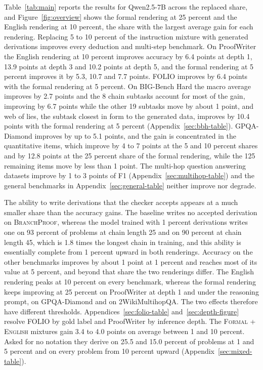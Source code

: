 \documentclass{article}
\newcommand{\formal}{\textsc{Formal}}
\newcommand{\nat}{\textsc{English}}
\newcommand{\branchproof}{\textsc{BranchProof}}
\begin{document}
Table~\ref{tab:main} reports the results for Qwen2.5-7B across the replaced
share, and Figure~\ref{fig:overview} shows the formal rendering at 25
percent and the English rendering at 10 percent, the share with the largest
average gain for each rendering. Replacing 5 to 10 percent
of the instruction mixture with generated derivations improves every
deduction and multi-step benchmark. On
ProofWriter the English rendering at 10 percent improves accuracy by 6.4
points at depth 1, 13.9 points at depth 3 and 10.2 points at depth 5, and
the formal rendering at 5 percent improves it by 5.3, 10.7 and 7.7 points.
FOLIO improves by 6.4 points with the formal rendering at 5 percent. On BIG-Bench Hard the macro average improves by 2.7 points and the 8 chain
subtasks account for most of the gain, improving by 6.7 points while the
other 19 subtasks move by about 1 point, and web of lies, the subtask
closest in form to the generated data, improves by 10.4 points with the
formal rendering at 5 percent (Appendix~\ref{sec:bbh-table}). GPQA-Diamond
improves by up to 5.1 points, and the gain is concentrated in the
quantitative items, which improve by 4 to 7 points at the 5 and 10 percent
shares and by 12.8 points at the 25 percent share of the formal rendering,
while the 125 remaining items move by less than 1 point. The multi-hop
question answering datasets improve by 1 to 3 points of F1
(Appendix~\ref{sec:multihop-table}) and the general benchmarks in
Appendix~\ref{sec:general-table} neither improve nor degrade.



The ability to write derivations that the checker accepts appears at a much
smaller share than the accuracy gains. The baseline writes no accepted
derivation on \branchproof{}, whereas the model trained with 1 percent
derivations writes one on 93 percent of problems at chain length 25 and on
90 percent at chain length 45, which is 1.8 times the longest chain in
training, and this ability is essentially complete from 1 percent upward in
both renderings. Accuracy on the other benchmarks improves by about 1 point
at 1 percent and reaches most of its value at 5 percent, and beyond that
share the two renderings differ. The English rendering peaks at 10 percent on every
benchmark, whereas the formal rendering keeps improving at 25 percent on
ProofWriter at depth 1 and under the reasoning prompt, on GPQA-Diamond and
on 2WikiMultihopQA. The two effects therefore have different thresholds.
Appendices~\ref{sec:folio-table} and~\ref{sec:depth-figure} resolve FOLIO
by gold label and ProofWriter by inference depth.
The \formal{} + \nat{} mixtures gain 3.4 to 4.0 points on average between 1
and 10 percent. Asked for no notation they derive on 25.5 and 15.0 percent of
problems at 1 and 5 percent and on every problem from 10 percent upward
(Appendix~\ref{sec:mixed-table}).
\end{document}
